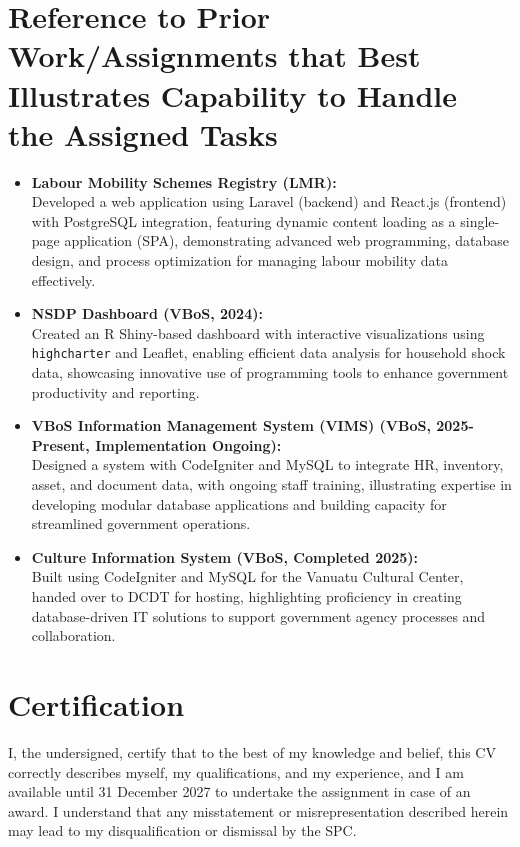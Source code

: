 \documentclass[
  letterpaper,
  DIV=11,
  numbers=noendperiod]{scrartcl}
\providecommand{\tightlist}{%
  \setlength{\itemsep}{0pt}\setlength{\parskip}{0pt}}
\begin{document}
\section{Reference to Prior Work/Assignments that Best Illustrates
Capability to Handle the Assigned
Tasks}\label{reference-to-prior-workassignments-that-best-illustrates-capability-to-handle-the-assigned-tasks}

\begin{itemize}
\tightlist
\item
  \textbf{Labour Mobility Schemes Registry (LMR):}\\
  Developed a web application using Laravel (backend) and React.js
  (frontend) with PostgreSQL integration, featuring dynamic content
  loading as a single-page application (SPA), demonstrating advanced web
  programming, database design, and process optimization for managing
  labour mobility data effectively.
\item
  \textbf{NSDP Dashboard (VBoS, 2024):}\\
  Created an R Shiny-based dashboard with interactive visualizations
  using \texttt{highcharter} and Leaflet, enabling efficient data
  analysis for household shock data, showcasing innovative use of
  programming tools to enhance government productivity and reporting.
\item
  \textbf{VBoS Information Management System (VIMS) (VBoS, 2025-Present,
  Implementation Ongoing):}\\
  Designed a system with CodeIgniter and MySQL to integrate HR,
  inventory, asset, and document data, with ongoing staff training,
  illustrating expertise in developing modular database applications and
  building capacity for streamlined government operations.
\item
  \textbf{Culture Information System (VBoS, Completed 2025):}\\
  Built using CodeIgniter and MySQL for the Vanuatu Cultural Center,
  handed over to DCDT for hosting, highlighting proficiency in creating
  database-driven IT solutions to support government agency processes
  and collaboration.
\end{itemize}

\section{Certification}\label{certification}

I, the undersigned, certify that to the best of my knowledge and belief,
this CV correctly describes myself, my qualifications, and my
experience, and I am available until 31 December 2027 to undertake the
assignment in case of an award. I understand that any misstatement or
misrepresentation described herein may lead to my disqualification or
dismissal by the SPC.
\end{document}
